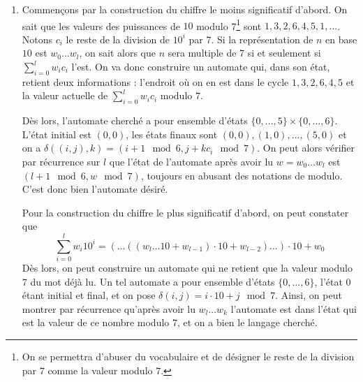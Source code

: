 \begin{sol}
\begin{enumerate}
\item Commençons par la construction du chiffre le moins significatif d'abord. On sait que les valeurs des puissances de $10$ modulo 7\footnote{On se permettra d'abuser du vocabulaire et de désigner le reste de la division par $7$ comme la valeur modulo $7$.} sont $1, 3, 2, 6, 4, 5, 1, \dots$. Notons $c_i$ le reste de la division de $10^i$ par 7. Si la représentation de $n$ en base $10$ est $w_0\dots w_l$, on sait alors que $n$ sera multiple de 7 si et seulement si $\sum_{i = 0}^l w_ic_i$ l'est. On va donc construire un automate qui, dans son état, retient deux informations : l'endroit où on en est dans le cycle $1, 3, 2, 6, 4, 5$ et la valeur actuelle de $\sum_{i = 0}^l w_ic_i$ modulo $7$.

Dès lors, l'automate cherché a pour ensemble d'états $\{0, \dots, 5\}\times\{0, \dots, 6\}$. L'état initial est $(0, 0)$, les états finaux sont $(0, 0),(1, 0), \dots, (5, 0)$ et on a $\delta((i, j),k) = (i + 1 \mod 6, j + kc_i \mod 7)$. On peut alors vérifier par récurrence sur $l$ que l'état de l'automate après avoir lu $w = w_0\dots w_l$ est $(l+1\mod 6, w\mod 7)$, toujours en abusant des notations de modulo. C'est donc bien l'automate désiré.

Pour la construction du chiffre le plus significatif d'abord, on peut constater que
$$\sum_{i = 0}^l w_i10^i = (\dots((w_l\dots 10 + w_{l-1})\cdot 10 + w_{l - 2})\dots)\cdot 10 + w_0$$
Dès lors, on peut construire un automate qui ne retient que la valeur modulo $7$ du mot déjà lu. Un tel automate a pour ensemble d'états $\{0, \dots, 6\}$, l'état $0$ étant initial et final, et on pose $\delta(i, j) = i \cdot 10 + j \mod 7$. Ainsi, on peut montrer par récurrence qu'après avoir lu $w_l\dots w_k$ l'automate est dans l'état qui est la valeur de ce nombre modulo $7$, et on a bien le langage cherché.
\end{enumerate}
\end{sol}


